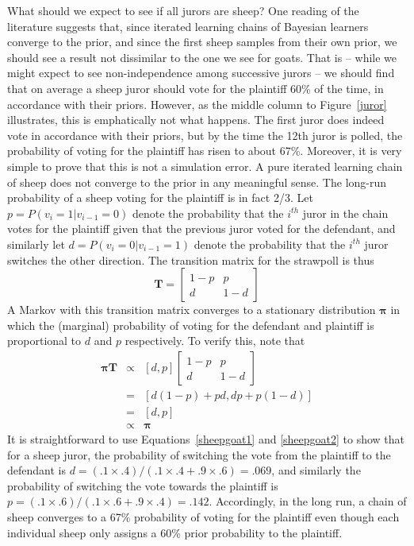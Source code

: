 \documentclass[doc]{apa6}
\begin{document}
What should we expect to see if all jurors are {\sc sheep}? One reading of the literature suggests that, since iterated learning chains of Bayesian learners converge to the prior, and since the first {\sc sheep} samples from their own prior, we should see a result not dissimilar to the one we see for {\sc goats}. That is -- while we might expect to see non-independence among successive jurors -- we should find that on average a {\sc sheep} juror should vote for the plaintiff 60\% of the time, in accordance with their priors. However, as the middle column to Figure~\ref{juror} illustrates, this is emphatically not what happens. The first juror does indeed vote in accordance with their priors, but by the time the 12th juror is polled, the probability of voting for the plaintiff has risen to about 67\%. Moreover, it is very simple to prove that this is not a simulation error. A pure iterated learning chain of {\sc sheep} does not converge to the prior in any meaningful sense. The long-run probability of a {\sc sheep} voting for the plaintiff is in fact 2/3. Let $p = P(v_i=1 | v_{i-1}=0)$ denote the probability that the $i^{th}$ juror in the chain votes for the plaintiff given that the previous juror voted for the defendant, and similarly let $d = P(v_i = 0 | v_{i-1}=1)$ denote the probability that the $i^{th}$ juror switches the other direction. The transition matrix for the strawpoll is thus
$$
\bm{T}
= \left[ \begin{array}{cc} 1-p & p \\ d & 1-d \end{array}\right]
$$
A Markov with this transition matrix converges to a stationary distribution $\bm{\pi}$ in which the (marginal) probability of voting for the defendant and plaintiff is proportional to $d$ and $p$ respectively. To verify this, note that
\begin{eqnarray*}
\bm{\pi} \bm{T}  &\propto& [d, p] \left[ \begin{array}{cc} 1-p & p \\ d & 1-d \end{array}\right] \\
&=& [d(1-p) + pd, dp + p(1-d)] \\
&=& [d, p]\\
&\propto& \bm{\pi}
\end{eqnarray*}
It is straightforward to use Equations~\ref{sheepgoat1} and \ref{sheepgoat2} to show that for a {\sc sheep} juror, the probability of switching the vote from the plaintiff to the defendant is $d = (.1 \times .4) / (.1 \times .4 + .9 \times.6) = .069$, and similarly the probability of switching the vote towards the plaintiff is $p = (.1 \times .6) / (.1 \times .6 + .9 \times.4) = .142$. Accordingly, in the long run, a chain of {\sc sheep} converges to a 67\% probability of voting for the plaintiff even though each individual {\sc sheep} only assigns a 60\% prior probability to the plaintiff.
\end{document}
